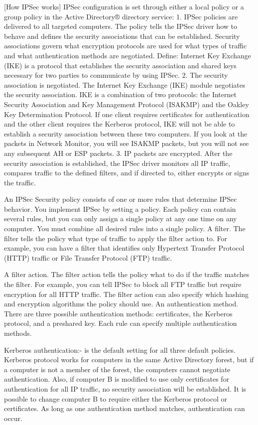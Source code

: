 \documentclass[conference, compsoc]{IEEEtran}
\begin{document}
	[How IPSec works]
IPSec configuration is set through either a local policy or a group policy in the Active Directory® directory service:
	1. IPSec policies are delivered to all targeted computers. The policy tells the IPSec driver how to behave and defines the security associations that can be established. Security associations govern what encryption protocols are used for what types of traffic and what authentication methods are negotiated.
	Define: Internet Key Exchange (IKE) is a protocol that establishes the security association and shared keys necessary for two parties to communicate by using IPSec.
	2. The security association is negotiated. The Internet Key Exchange (IKE) module negotiates the security association. IKE is a combination of two protocols: the Internet Security Association and Key Management Protocol (ISAKMP) and the Oakley Key Determination Protocol. If one client requires certificates for authentication and the other client requires the Kerberos protocol, IKE will not be able to establish a security  association between these two computers. If you look at the packets in Network Monitor, you will see ISAKMP packets, but you will not see any subsequent AH or ESP packets. 	
	3. IP packets are encrypted. After the security association is established, the IPSec driver monitors all IP traffic, compares traffic to the defined filters, and if directed to, either encrypts or signs the traffic.

An IPSec Security policy consists of one or more rules that determine IPSec behavior.
You implement IPSec by setting a policy. Each policy can contain several rules, but you can only assign a single policy at any one time on any computer. You must combine all desired rules into a single policy.
 A filter. The filter tells the policy what type of traffic to apply the filter action to. For example, you can have a filter that identifies only Hypertext Transfer Protocol (HTTP) traffic or File Transfer Protocol (FTP) traffic.

A filter action. The filter action tells the policy what to do if the traffic matches the filter. For example, you can tell IPSec to block all FTP traffic but require encryption for all HTTP traffic. The filter action can also specify which hashing and encryption algorithms the policy should use.
An authentication method. There are three possible authentication methods: certificates, the Kerberos protocol, and a preshared key. Each rule can specify multiple authentication methods.


Kerberos authentication:- 
     is the default setting for all three default policies. Kerberos protocol works for computers in the same Active Directory forest, but if a computer is not a member of the forest, the computers cannot negotiate authentication. Also, if computer B is modified to use only certificates for authentication for all IP traffic, no security association will be established. It is possible to change computer B to require either the Kerberos protocol or certificates. As long as one authentication method matches, authentication can occur.
     
\end{document}
